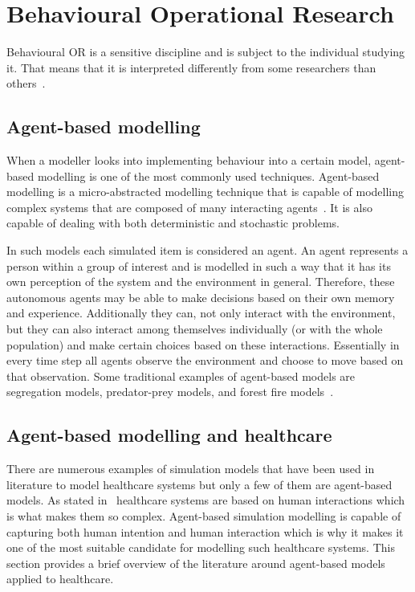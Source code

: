 \section{Behavioural Operational Research}
\label{sec:lit_review_behavioural_modelling}

Behavioural OR is a sensitive discipline and is subject to the individual
studying it.
That means that it is interpreted differently from some researchers than
others~\cite{hacking1983representing}.

\subsection{Agent-based modelling}
When a modeller looks into implementing behaviour into a certain model,
agent-based modelling is one of the most commonly used techniques.
Agent-based modelling is a micro-abstracted modelling technique that is
capable of modelling complex systems that are composed of many interacting
agents~\cite{greasley2016behavior, jackson2017agent}.
It is also capable of dealing with both deterministic and stochastic
problems.

In such models each simulated item is considered an agent.
An agent represents a person within a group of interest and is modelled in such
a way that it has its own perception of the system and the environment in
general.
Therefore, these autonomous agents may be able to make decisions based on their
own memory and experience.
Additionally they can, not only interact with the environment, but they can
also interact among themselves individually (or with the whole population) and
make certain choices based on these interactions.
Essentially in every time step all agents observe the environment and choose to
move based on that observation.
Some traditional examples of agent-based models are segregation models,
predator-prey models, and forest fire models~\cite{jackson2017agent}.


\subsection{Agent-based modelling and healthcare}

There are numerous examples of simulation models that have been used in
literature to model healthcare systems but only a few of them are agent-based
models.
As stated in~\cite{EscuderoMarin20111239} healthcare systems are based on human
interactions which is what makes them so complex.
Agent-based simulation modelling is capable of capturing both human intention
and human interaction which is why it makes it one of the most suitable
candidate for modelling such healthcare systems.
This section provides a brief overview of the literature around agent-based
models applied to healthcare.


